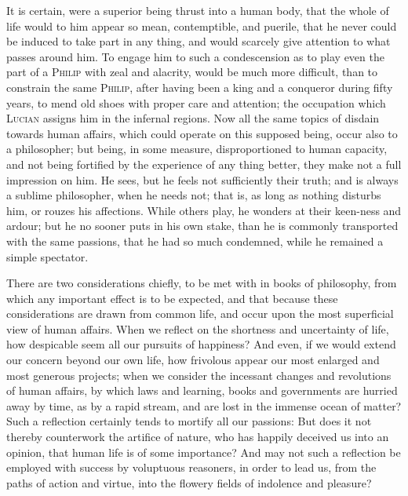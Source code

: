 It is certain, were a superior being thrust into a human body, that
the whole of life would to him appear so mean, contemptible, and
puerile, that he never could be induced to take part in any thing, and
would scarcely give attention to what passes around him. To engage him
to such a condescension as to play even the part of a \textsc{Philip}
with zeal and alacrity, would be much more difficult, than to
constrain the same \textsc{Philip}, after having been a king and a
conqueror during fifty years, to mend old shoes with proper care and
attention; the occupation which \textsc{Lucian} assigns him in the
infernal regions. Now all the same topics of disdain towards human
affairs, which could operate on this supposed being, occur also to a
philosopher; but being, in some measure, disproportioned to human
capacity, and not being fortified by the experience of any thing
better, they make not a full impression on him. He sees, but he feels
not sufficiently their truth; and is always a sublime philosopher,
when he needs not; that is, as long as nothing disturbs him, or rouzes
his affections. While others play, he wonders at their
keen-ness and ardour; but he no sooner puts in his own
stake, than he is commonly transported with the same passions, that he
had so much condemned, while he remained a simple spectator.

There are two considerations chiefly, to be met with in books of
philosophy, from which any important effect is to be expected, and
that because these considerations are drawn from common life, and
occur upon the most superficial view of human affairs. When we reflect
on the shortness and uncertainty of life, how despicable seem all our
pursuits of happiness? And even, if we would extend our concern beyond
our own life, how frivolous appear our most enlarged and most generous
projects; when we consider the incessant changes and revolutions of
human affairs, by which laws and learning, books and governments are
hurried away by time, as by a rapid stream, and are lost in the
immense ocean of matter? Such a reflection certainly tends to mortify
all our passions: But does it not thereby counterwork the artifice of
nature, who has happily deceived us into an opinion, that human life
is of some importance? And may not such a reflection be employed with
success by voluptuous reasoners, in order to lead us, from the paths
of action and virtue, into the flowery fields of indolence and
pleasure?



